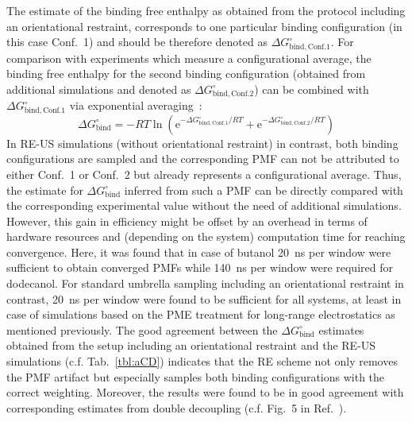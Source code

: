 \documentclass[9pt,lessons,pubversion]{livecoms}
\begin{document}
The estimate of the binding free enthalpy as obtained from the protocol including an orientational restraint, corresponds to one particular binding configuration (in this case Conf.~1) and should be therefore denoted as 
$\Delta G^\circ_\mathrm{bind, Conf. 1}$.
For comparison with experiments which measure a configurational average, the binding free enthalpy for the second binding configuration 
(obtained from additional simulations and denoted as $\Delta G^\circ_\mathrm{bind, Conf. 2}$) can be combined with $\Delta G^\circ_\mathrm{bind, Conf. 1}$ via exponential averaging~\cite{mobley2006use}:
\begin{equation}
\Delta G^\circ_\mathrm{bind} = -RT \ln\left(   \mathrm{e}^{-\Delta G^\circ_\mathrm{bind, Conf. 1}/RT}  +  \mathrm{e}^{-\Delta G^\circ_\mathrm{bind, Conf. 2}/RT}  \right)
\label{eq:ExpAv_1}
\end{equation}
In RE-US simulations (without orientational restraint) in contrast, both binding configurations are sampled and the corresponding 
PMF can not be attributed to either Conf.~1 or Conf.~2 but already represents a configurational average.
Thus, the estimate for $\Delta G^\circ_\mathrm{bind}$ inferred from such a PMF can be directly compared with the corresponding experimental value without the need of  additional simulations. 
However, this gain in efficiency might be offset by an overhead in terms of hardware resources and (depending on the system) computation time for reaching convergence.  
Here, it was found that in case of butanol 20~ns per window were sufficient to obtain converged PMFs while 140~ns per window were required for dodecanol.
For standard umbrella sampling including an orientational restraint in contrast, 20~ns per window were found to be sufficient for all systems, at least in case of simulations based on the PME treatment for 
long-range electrostatics as mentioned previously.  
The good agreement between the $\Delta G^\circ_\mathrm{bind}$ estimates obtained from the setup including an orientational restraint and the RE-US simulations (c.f. Tab.~\ref{tbl:aCD})  
indicates that the RE scheme not only removes the PMF artifact but especially samples both binding configurations with the correct weighting.
Moreover, the results were found to be in good agreement with corresponding estimates from double decoupling (c.f. Fig.~5 in Ref.~). 
\end{document}
